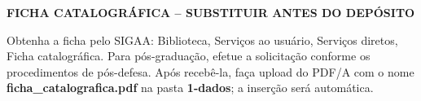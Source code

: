 %
  {\def\arquivoficha{1-dados/ficha_catalografica.pdf}}{\let\arquivoficha\relax}
\ifx\arquivoficha\relax
  \clearpage\thispagestyle{empty}
  \noindent\textbf{FICHA CATALOGRÁFICA -- SUBSTITUIR ANTES DO DEPÓSITO}\par\medskip
  Obtenha a ficha pelo SIGAA: Biblioteca, Serviços ao usuário, Serviços diretos, Ficha catalográfica. Para pós-graduação, efetue a solicitação conforme os procedimentos de pós-defesa. Após recebê-la, faça upload do PDF/A com o nome \textbf{ficha\_catalografica.pdf} na pasta \textbf{1-dados}; a inserção será automática.
  \clearpage
\else
\fi
\addtocounter{page}{-1}
